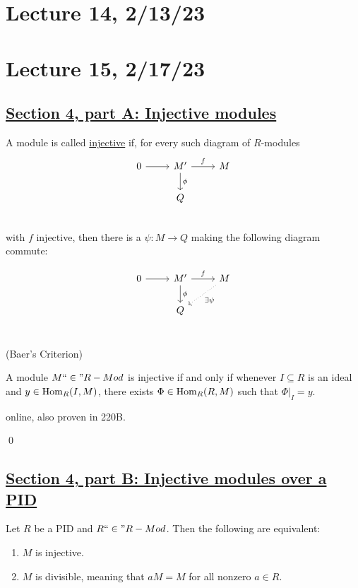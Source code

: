 \documentclass[x11names,reqno,14pt]{extarticle}
\newcommand{\fin}{``\in"}
\begin{document}
\section*{Lecture 14, 2/13/23}

\section*{Lecture 15, 2/17/23}

\subsection*{\underline{Section 4, part A: Injective modules}}


A module is called \underline{injective} if, for every such diagram of $R$-modules
\[
\begin{tikzcd}
0\ar[r] & M'\ar[d, "\phi"]\ar[r, "f"] & M \\
& Q & \\
\end{tikzcd}
\]
with $f$ injective, then there is a $\psi:M\to Q$ making the following diagram commute:

\[
\begin{tikzcd}
0\ar[r] & M'\ar[d, "\phi"]\ar[r, "f"] & M\ar[dl, dotted, "\exists\psi"] \\
& Q & \\
\end{tikzcd}
\]

\prop (Baer's Criterion)

A module $M \fin R-Mod$ is injective if and only if whenever $I \subseteq R$ is an ideal and $y\in{\mathrm{Hom}}_R(I, M)$, there exists $\Phi\in{\mathrm{Hom}}_R(R, M)$ such that $	\Phi|_I = y$.

\proof

online, also proven in 220B.

\qed

\subsection*{\underline{Section 4, part B: Injective modules over a PID}}

\thm

Let $R$ be a PID and $R \fin R-Mod$. Then the following are equivalent:

\begin{enumerate}[label=(\roman*)]

\item $M$ is injective. 

\item $M$ is divisible, meaning that $aM = M$ for all nonzero $a \in R$. 

\end{enumerate}
\end{document}
